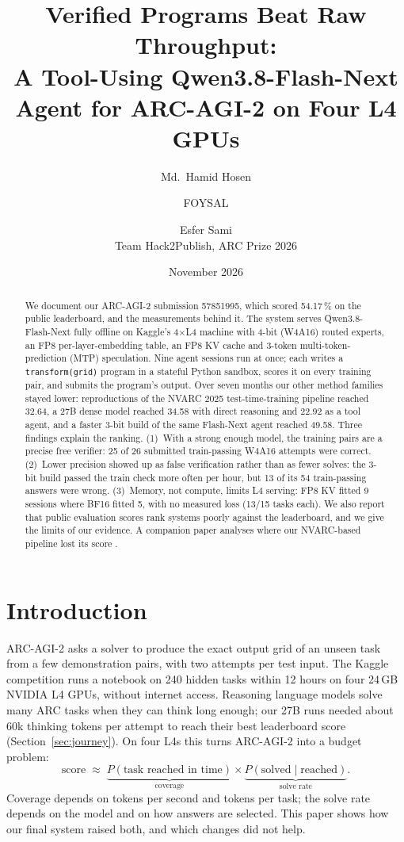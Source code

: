 \documentclass[11pt]{article}
\title{Verified Programs Beat Raw Throughput:\\
A Tool-Using Qwen3.8-Flash-Next Agent for ARC-AGI-2 on Four L4 GPUs}
\author{Md.\ Hamid Hosen \and FOYSAL \and Esfer Sami\\[2pt]
\small Team Hack2Publish, ARC Prize 2026}
\date{November 2026}
\begin{document}
\maketitle

\begin{abstract}
We document our ARC-AGI-2 submission 57851995, which scored 54.17\,\% on the public leaderboard, and the measurements behind it.
The system serves Qwen3.8-Flash-Next fully offline on Kaggle's 4$\times$L4 machine with 4-bit (W4A16) routed experts, an FP8 per-layer-embedding table, an FP8 KV cache and 3-token multi-token-prediction (MTP) speculation.
Nine agent sessions run at once; each writes a \texttt{transform(grid)} program in a stateful Python sandbox, scores it on every training pair, and submits the program's output.
Over seven months our other method families stayed lower: reproductions of the NVARC 2025 test-time-training pipeline reached 32.64, a 27B dense model reached 34.58 with direct reasoning and 22.92 as a tool agent, and a faster 3-bit build of the same Flash-Next agent reached 49.58.
Three findings explain the ranking.
(1)~With a strong enough model, the training pairs are a precise free verifier: 25 of 26 submitted train-passing W4A16 attempts were correct.
(2)~Lower precision showed up as false verification rather than as fewer solves: the 3-bit build passed the train check more often per hour, but 13 of its 54 train-passing answers were wrong.
(3)~Memory, not compute, limits L4 serving: FP8 KV fitted 9 sessions where BF16 fitted 5, with no measured loss (13/15 tasks each).
We also report that public evaluation scores rank systems poorly against the leaderboard, and we give the limits of our evidence.
A companion paper analyses where our NVARC-based pipeline lost its score \cite{paper1}.
\end{abstract}

\section{Introduction}
ARC-AGI-2 \cite{arcagi2,arctr2025} asks a solver to produce the exact output grid of an unseen task from a few demonstration pairs, with two attempts per test input. The Kaggle competition runs a notebook on 240 hidden tasks within 12 hours on four 24\,GB NVIDIA L4 GPUs, without internet access.
Reasoning language models solve many ARC tasks when they can think long enough; our 27B runs needed about 60k thinking tokens per attempt to reach their best leaderboard score (Section~\ref{sec:journey}).
On four L4s this turns ARC-AGI-2 into a budget problem:
\begin{equation}
\text{score} \;\approx\; \underbrace{P(\text{task reached in time})}_{\text{coverage}} \times \underbrace{P(\text{solved}\mid\text{reached})}_{\text{solve rate}} .
\end{equation}
Coverage depends on tokens per second and tokens per task; the solve rate depends on the model and on how answers are selected.
This paper shows how our final system raised both, and which changes did not help.
\end{document}
